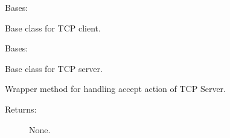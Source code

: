 \documentclass[letterpaper,10pt,english]{sphinxmanual}
\begin{document}
\begin{fulllineitems}
\label{\detokenize{QConnectionLibrary:QConnectionLibrary.tcp.tcp_base.TCPBaseClient}}
\sphinxAtStartPar
Bases: 

\sphinxAtStartPar
Base class for TCP client.

\begin{fulllineitems}
\label{\detokenize{QConnectionLibrary:QConnectionLibrary.tcp.tcp_base.TCPBaseClient.connect}}
\end{fulllineitems}


\end{fulllineitems}


\begin{fulllineitems}
\label{\detokenize{QConnectionLibrary:QConnectionLibrary.tcp.tcp_base.TCPBaseServer}}
\sphinxAtStartPar
Bases: 

\sphinxAtStartPar
Base class for TCP server.

\begin{fulllineitems}
\label{\detokenize{QConnectionLibrary:QConnectionLibrary.tcp.tcp_base.TCPBaseServer.accept_connection}}
\sphinxAtStartPar
Wrapper method for handling accept action of TCP Server.
\begin{description}
\item[{Returns:}] \leavevmode
\sphinxAtStartPar
None.

\end{description}

\end{fulllineitems}


\end{fulllineitems}
\end{document}
